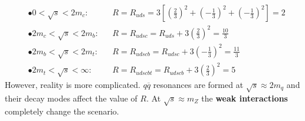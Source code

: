 \documentclass[10.75pt,a4paper,openright,bottom=2cm]{article}
\begin{document}
\[
\begin{aligned}
&\bullet 0<\sqrt{s}<2m_c: &&R=R_{uds}=3\left[\left(\frac{2}{3}\right)^2+\left(-\frac{1}{3}\right)^2+\left(-\frac{1}{3}\right)^2\right]=2\\
&\bullet 2m_c<\sqrt{s}<2m_b: &&R=R_{udsc}=R_{uds}+3\left(\frac{2}{3}\right)^2=\frac{10}{3}\\
&\bullet 2m_b<\sqrt{s}<2m_t: &&R=R_{udscb}=R_{udsc}+3\left(-\frac{1}{3}\right)^2=\frac{11}{3}\\
&\bullet 2m_t<\sqrt{s}<\infty: &&R=R_{udscbt}=R_{udscb}+3\left(\frac{2}{3}\right)^2=5
\end{aligned}
\]
However, reality is more complicated. $q\overline{q}$ resonances are formed at $\sqrt{s}\approx2m_q$ and their decay modes affect the value of $R$. At $\sqrt{s}\approx m_Z$ the \textbf{weak interactions} completely change the scenario.
\end{document}
